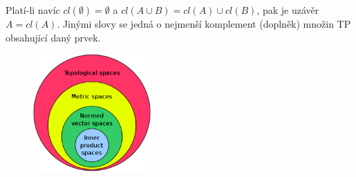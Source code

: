 Platí-li navíc $cl(\emptyset) = \emptyset$ a $cl(A \cup B) = cl(A) \cup cl(B)$, pak je uzávěr $A = cl(A)$. Jinými slovy se jedná o nejmenší komplement (doplněk) množin TP obsahující daný prvek.
\\
\begin{figure}[H]
	\centering
	\includegraphics[width=0.4\textwidth]{assets/9_tpl_space}
\end{figure}



